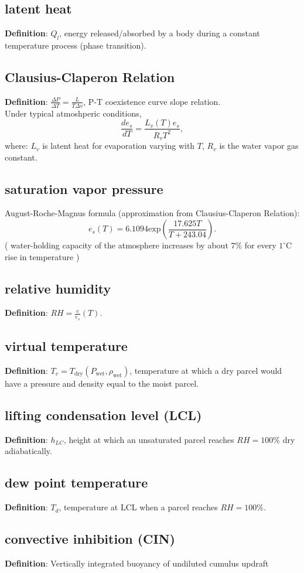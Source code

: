 \subsection{latent heat}
{\bf Definition}: $Q_l$, energy released/absorbed by a body during a constant temperature process (phase transition).


\subsection{Clausius-Claperon Relation}
{\bf Definition}: $\frac{\Delta P}{\Delta T} = \frac{L}{T\Delta v}$, P-T coexistence curve slope relation. \\
Under typical atmoshperic conditions, 
\begin{equation}
   \frac{d e_s}{dT} = \frac{L_v(T)e_s}{R_vT^2}, 
\end{equation}
where: $L_v$ is latent heat for evaporation varying with $T$, 
$R_v$ is the water vapor gas constant. \\

\subsection{saturation vapor pressure}
\noindent August-Roche-Magnus formula (approximation from Clausius-Claperon Relation): \\
\begin{equation}
   e_s(T) = 6.1094 \text{exp}(\frac{17.625T}{T+243.04}).
\end{equation}
( water-holding capacity of the atmosphere increases by about $7\%$ for every $1^{\circ}$C rise in temperature )

\subsection{relative humidity}
{\bf Definition}: $RH = \frac{e}{e_s}(T)$.

\subsection{virtual temperature}
{\bf Definition}: $T_v = T_\text{dry}(P_\text{wet},\rho_\text{wet})$, temperature at which a dry parcel would have a pressure and density equal to the moist parcel. 

\subsection{lifting condensation level (LCL)}
{\bf Definition}: $h_{LC}$, height at which an unsaturated parcel reaches $RH=100\%$ dry adiabatically.

\subsection{dew point temperature}
{\bf Definition}: $T_d$, temperature at LCL when a parcel reaches $RH=100\%$.

\subsection{convective inhibition (CIN)}
{\bf Definition}: Vertically integrated buoyancy of undiluted cumulus updraft
